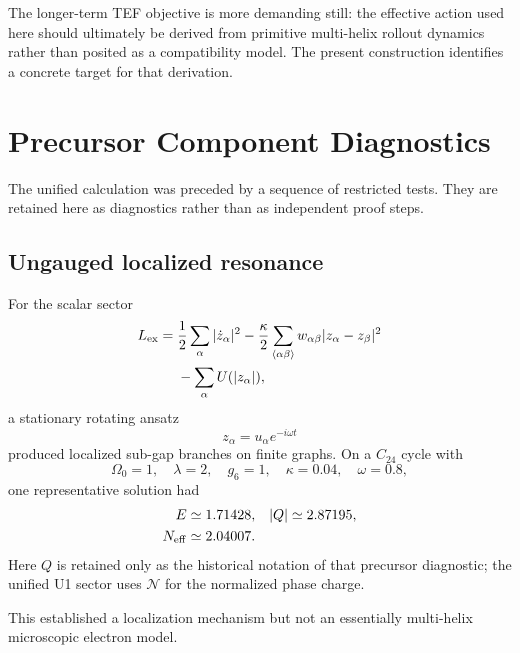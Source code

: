 \documentclass[11pt]{article}
\begin{document}
The longer-term TEF objective is more demanding still: the effective action used here should ultimately be derived from primitive multi-helix rollout dynamics rather than posited as a compatibility model. The present construction identifies a concrete target for that derivation.

\appendix

\section{Precursor Component Diagnostics}

The unified calculation was preceded by a sequence of restricted tests. They are retained here as diagnostics rather than as independent proof steps.

\subsection{Ungauged localized resonance}

For the scalar sector
\begin{equation}
\begin{aligned}
L_{\rm ex}
={}&\frac12\sum_\alpha|\dot z_\alpha|^2
-\frac{\kappa}{2}
\sum_{\langle\alpha\beta\rangle}
w_{\alpha\beta}|z_\alpha-z_\beta|^2
\\
&-\sum_\alpha U(|z_\alpha|),
\end{aligned}
\end{equation}
a stationary rotating ansatz
\begin{equation}
z_\alpha=u_\alpha e^{-i\omega t}
\end{equation}
produced localized sub-gap branches on finite graphs. On a \(C_{24}\) cycle with
\begin{equation}
\Omega_0=1,\quad
\lambda=2,\quad
g_6=1,\quad
\kappa=0.04,\quad
\omega=0.8,
\end{equation}
one representative solution had
\begin{equation}
\begin{aligned}
E&\simeq1.71428,
&|Q|&\simeq2.87195,
\\
N_{\rm eff}&\simeq2.04007.
\end{aligned}
\end{equation}
Here \(Q\) is retained only as the historical notation of that precursor diagnostic; the unified U1 sector uses \(\mathcal N\) for the normalized phase charge.

This established a localization mechanism but not an essentially multi-helix microscopic electron model.
\end{document}
